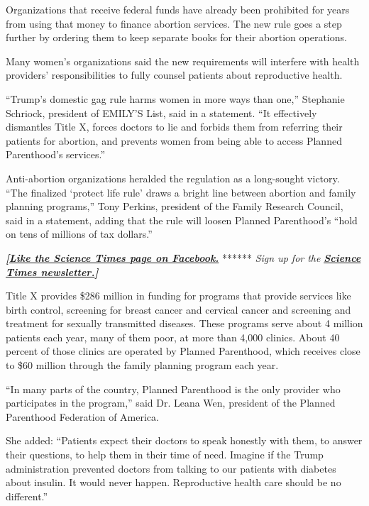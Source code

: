 Organizations that receive federal funds have already been prohibited
for years from using that money to finance abortion services. The new
rule goes a step further by ordering them to keep separate books for
their abortion operations.

Many women's organizations said the new requirements will interfere with
health providers' responsibilities to fully counsel patients about
reproductive health.

``Trump's domestic gag rule harms women in more ways than one,''
Stephanie Schriock, president of EMILY'S List, said in a statement. ``It
effectively dismantles Title X, forces doctors to lie and forbids them
from referring their patients for abortion, and prevents women from
being able to access Planned Parenthood's services.''

Anti-abortion organizations heralded the regulation as a long-sought
victory. ``The finalized `protect life rule' draws a bright line between
abortion and family planning programs,'' Tony Perkins, president of the
Family Research Council, said in a statement, adding that the rule will
loosen Planned Parenthood's ``hold on tens of millions of tax dollars.''

\textbf{\emph{{[}}\href{http://on.fb.me/1paTQ1h}{\emph{Like the Science
Times page on Facebook.}}} ****** \emph{\textbar{} Sign up for the}
\textbf{\href{http://nyti.ms/1MbHaRU}{\emph{Science Times
newsletter.}}\emph{{]}}}

Title X provides \$286 million in funding for programs that provide
services like birth control, screening for breast cancer and cervical
cancer and screening and treatment for sexually transmitted diseases.
These programs serve about 4 million patients each year, many of them
poor, at more than 4,000 clinics. About 40 percent of those clinics are
operated by Planned Parenthood, which receives close to \$60 million
through the family planning program each year.

``In many parts of the country, Planned Parenthood is the only provider
who participates in the program,'' said Dr. Leana Wen, president of the
Planned Parenthood Federation of America.

She added: ``Patients expect their doctors to speak honestly with them,
to answer their questions, to help them in their time of need. Imagine
if the Trump administration prevented doctors from talking to our
patients with diabetes about insulin. It would never happen.
Reproductive health care should be no different.''

